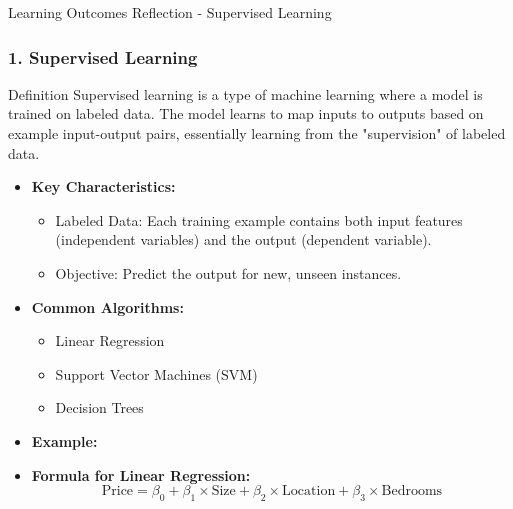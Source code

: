 \documentclass[aspectratio=169]{beamer}
\begin{document}
\begin{frame}[fragile]{Learning Outcomes Reflection - Supervised Learning}
    \frametitle{1. Supervised Learning}
    \begin{block}{Definition}
        Supervised learning is a type of machine learning where a model is trained on labeled data. The model learns to map inputs to outputs based on example input-output pairs, essentially learning from the "supervision" of labeled data.
    \end{block}

    \begin{itemize}
        \item \textbf{Key Characteristics:}
        \begin{itemize}
            \item Labeled Data: Each training example contains both input features (independent variables) and the output (dependent variable).
            \item Objective: Predict the output for new, unseen instances.
        \end{itemize}
        
        \item \textbf{Common Algorithms:}
        \begin{itemize}
            \item Linear Regression
            \item Support Vector Machines (SVM)
            \item Decision Trees
        \end{itemize}

        \item \textbf{Example:}
          
        \item \textbf{Formula for Linear Regression:}
        \begin{equation}
            \text{Price} = \beta_0 + \beta_1 \times \text{Size} + \beta_2 \times \text{Location} + \beta_3 \times \text{Bedrooms} 
        \end{equation}
    \end{itemize}
\end{frame}
\end{document}
